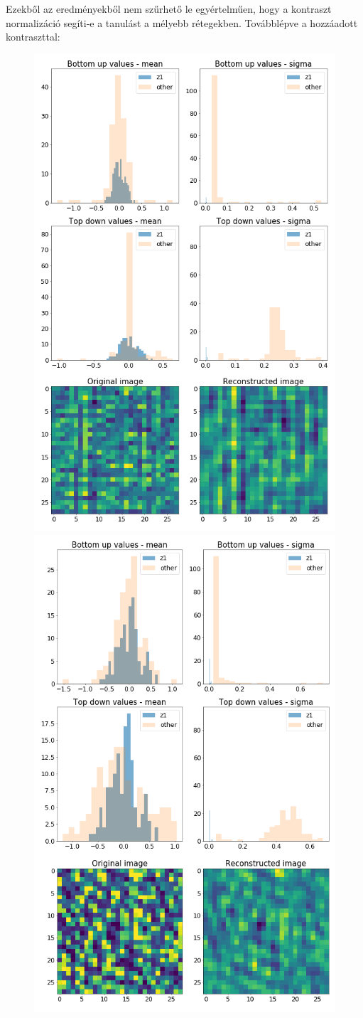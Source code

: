 \documentclass[12pt, english]{article}
\begin{document}
\vspace{4mm}

\par Ezekből az eredményekből nem szűrhető le egyértelműen, hogy a kontraszt normalizáció segíti-e a tanulást a mélyebb rétegekben. Továbblépve a hozzáadott kontraszttal:

\vspace{4mm}

\begin{figure}[H]
  \begin{minipage}{0.5\linewidth}
    \centering
    \includegraphics[width=.6\linewidth]{z1_vis/z1_vis_contrast_no_norm/15_DenseLinLinLadderVAE_textures_noContrastNorm_contrast-stats-1_TD_BU_COMPS_1.png}
  \end{minipage}
  \begin{minipage}{0.5\linewidth}
    \centering
    \includegraphics[width=.6\linewidth]{z1_vis/z1_vis_contrast_no_norm/15_DenseLinLinLadderVAE_textures_noContrastNorm_contrast-stats-2_TD_BU_COMPS_1.png} 

\end{minipage}
\end{figure}
\end{document}
